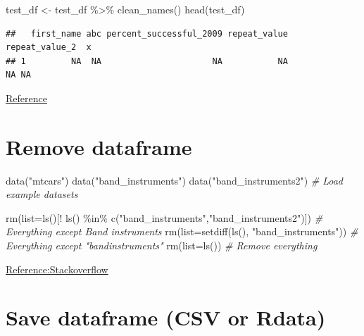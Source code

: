 \documentclass[
]{book}
\newenvironment{Shaded}{\begin{snugshade}}{\end{snugshade}}
\newcommand{\AttributeTok}[1]{\textcolor[rgb]{0.77,0.63,0.00}{#1}}
\newcommand{\CommentTok}[1]{\textcolor[rgb]{0.56,0.35,0.01}{\textit{#1}}}
\newcommand{\FunctionTok}[1]{\textcolor[rgb]{0.00,0.00,0.00}{#1}}
\newcommand{\NormalTok}[1]{#1}
\newcommand{\OtherTok}[1]{\textcolor[rgb]{0.56,0.35,0.01}{#1}}
\newcommand{\SpecialCharTok}[1]{\textcolor[rgb]{0.00,0.00,0.00}{#1}}
\newcommand{\StringTok}[1]{\textcolor[rgb]{0.31,0.60,0.02}{#1}}
\begin{document}
\begin{Shaded}
\begin{Highlighting}[]
\NormalTok{test\_df }\OtherTok{\textless{}{-}}\NormalTok{ test\_df }\SpecialCharTok{\%\textgreater{}\%}
  \FunctionTok{clean\_names}\NormalTok{()}
\FunctionTok{head}\NormalTok{(test\_df)}
\end{Highlighting}
\end{Shaded}

\begin{verbatim}
##   first_name abc percent_successful_2009 repeat_value repeat_value_2  x
## 1         NA  NA                      NA           NA             NA NA
\end{verbatim}

\href{https://cran.r-project.org/web/packages/janitor/vignettes/janitor.html}{Reference}

\hypertarget{remove-dataframe}{%
\section{Remove dataframe}\label{remove-dataframe}}

\begin{Shaded}
\begin{Highlighting}[]
\FunctionTok{data}\NormalTok{(}\StringTok{"mtcars"}\NormalTok{)}
\FunctionTok{data}\NormalTok{(}\StringTok{"band\_instruments"}\NormalTok{)}
\FunctionTok{data}\NormalTok{(}\StringTok{"band\_instruments2"}\NormalTok{) }\CommentTok{\# Load example datasets}

\FunctionTok{rm}\NormalTok{(}\AttributeTok{list=}\FunctionTok{ls}\NormalTok{()[}\SpecialCharTok{!} \FunctionTok{ls}\NormalTok{() }\SpecialCharTok{\%in\%} \FunctionTok{c}\NormalTok{(}\StringTok{"band\_instruments"}\NormalTok{,}\StringTok{"band\_instruments2"}\NormalTok{)]) }\CommentTok{\# Everything except Band instruments}
\FunctionTok{rm}\NormalTok{(}\AttributeTok{list=}\FunctionTok{setdiff}\NormalTok{(}\FunctionTok{ls}\NormalTok{(), }\StringTok{"band\_instruments"}\NormalTok{)) }\CommentTok{\# Everything except "bandinstruments"}
\FunctionTok{rm}\NormalTok{(}\AttributeTok{list=}\FunctionTok{ls}\NormalTok{()) }\CommentTok{\# Remove everything}
\end{Highlighting}
\end{Shaded}

\href{https://stackoverflow.com/questions/6190051/how-can-i-remove-all-objects-but-one-from-the-workspace-in-r}{Reference:Stackoverflow}

\hypertarget{save-dataframe-csv-or-rdata}{%
\section{Save dataframe (CSV or Rdata)}\label{save-dataframe-csv-or-rdata}}
\end{document}
